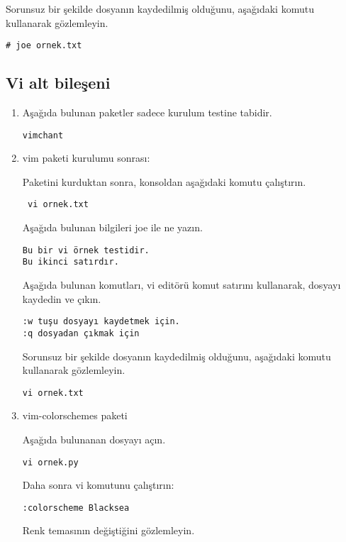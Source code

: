 \documentclass[a4paper,10pt]{article}
\begin{document}
Sorunsuz bir şekilde dosyanın kaydedilmiş olduğunu, aşağıdaki komutu kullanarak gözlemleyin.
\begin{verbatim}
# joe ornek.txt 
\end{verbatim}

\subsection*{Vi alt bileşeni}

\begin{enumerate}

\item Aşağıda bulunan paketler sadece kurulum testine tabidir.
\begin{verbatim}
vimchant
\end{verbatim}


\item vim paketi kurulumu sonrası:

Paketini kurduktan sonra, konsoldan aşağıdaki komutu çalıştırın.

\begin{verbatim}
 vi ornek.txt
\end{verbatim}

Aşağıda bulunan bilgileri joe ile ne yazın.
\begin{verbatim}
Bu bir vi örnek testidir.
Bu ikinci satırdır.
\end{verbatim}

Aşağıda bulunan komutları, vi editörü komut satırını kullanarak, dosyayı kaydedin ve çıkın.
\begin{verbatim}
:w tuşu dosyayı kaydetmek için.
:q dosyadan çıkmak için
\end{verbatim}

Sorunsuz bir şekilde dosyanın kaydedilmiş olduğunu, aşağıdaki komutu kullanarak gözlemleyin.
\begin{verbatim}
vi ornek.txt 
\end{verbatim}

\item vim-colorschemes paketi

Aşağıda bulunanan dosyayı açın.
\begin{verbatim}
vi ornek.py
\end{verbatim}

Daha sonra vi komutunu çalıştırın:
\begin{verbatim}
:colorscheme Blacksea
\end{verbatim}

Renk temasının değiştiğini gözlemleyin.


\end{enumerate}
\end{document}
